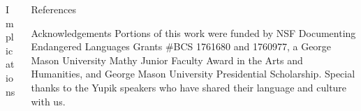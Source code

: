 \documentclass[usenames,dvipsnames]{beamer}
\begin{document}
\begin{frame}[fragile]
\begin{columns}[T]
\begin{column}{0.46\textwidth}
\begin{block}{Implications}
\end{block}
\end{column}

\begin{column}{0.46\textwidth}
\begin{block}{References}
\tiny
\nocite{*}

%

\end{block}
\begin{block}{Acknowledgements}
\tiny
Portions of this work were funded by NSF Documenting Endangered Languages Grants \#BCS 1761680 and 1760977, a George Mason University Mathy Junior Faculty Award in the Arts and Humanities, and George Mason University Presidential Scholarship. Special thanks to the Yupik speakers who have shared their language and culture with us.
\end{block}
\end{column}

\end{columns}

\end{frame}
\end{document}
